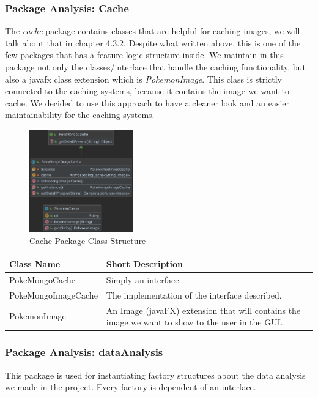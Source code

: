 \subsubsection{Package Analysis: Cache}
The \textit{cache} package contains classes that are helpful for caching images, we will talk about that in chapter 4.3.2. Despite what written above, this is one of the few packages that has a feature logic structure inside. We maintain in this package not only the classes/interface that handle the caching functionality, but also a javafx class extension which is \textit{PokemonImage}. This class is strictly connected to the caching systems, because it contains the image we want to cache. We decided to use this approach to have a cleaner look and an easier maintainability for the caching systems. 
\begin{figure}[H]
	\centering
	\includegraphics[width=0.4\textwidth]{img/cache_package.png}
	\caption{Cache Package Class Structure}
\end{figure}

\begingroup
\setlength{\tabcolsep}{10pt} %
\renewcommand{\arraystretch}{1.5} %
\begin{center}
	\begin{longtable}{| m{14em} | m{19em} |} 
		\hline
		\textbf{Class Name} & \textbf{Short Description} \\ [0.5ex] 
		\hline
		PokeMongoCache & Simply an interface.\\ 
		\hline
		PokeMongoImageCache & The implementation of the interface described.\\ 
		\hline
		PokemonImage & An Image (javaFX) extension that will contains the image we want to show to the user in the GUI.\\ 
		\hline
	\end{longtable}
\end{center}
\endgroup

\subsubsection{Package Analysis: dataAnalysis}
This package is used for instantiating factory structures about the data analysis we made in the project. Every factory is dependent of an interface. 


